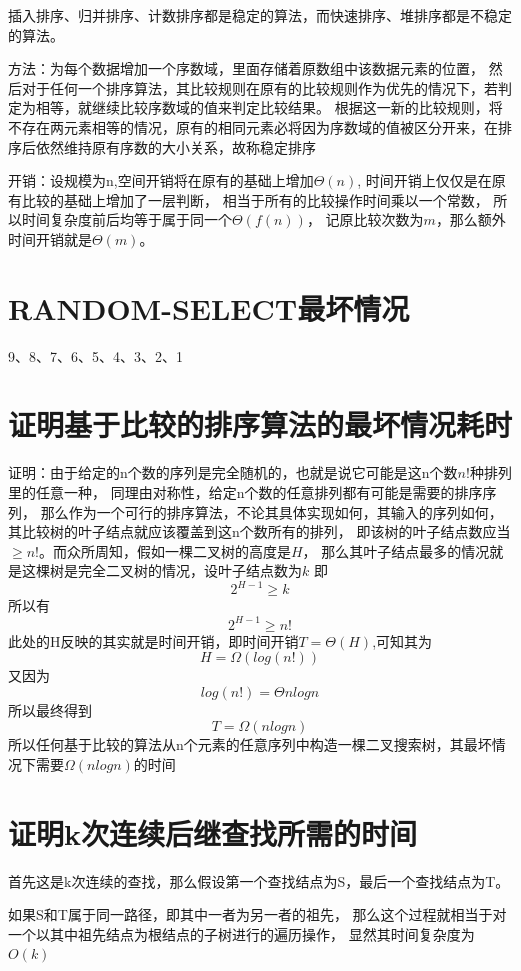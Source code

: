 \documentclass[cn,11pt,chinese]{elegantbook}
\begin{document}
插入排序、归并排序、计数排序都是稳定的算法，而快速排序、堆排序都是不稳定的算法。

方法：为每个数据增加一个序数域，里面存储着原数组中该数据元素的位置，
然后对于任何一个排序算法，其比较规则在原有的比较规则作为优先的情况下，若判定为相等，就继续比较序数域的值来判定比较结果。
根据这一新的比较规则，将不存在两元素相等的情况，原有的相同元素必将因为序数域的值被区分开来，在排序后依然维持原有序数的大小关系，故称稳定排序

开销：设规模为n,空间开销将在原有的基础上增加$\varTheta (n)$,
时间开销上仅仅是在原有比较的基础上增加了一层判断，
相当于所有的比较操作时间乘以一个常数，
所以时间复杂度前后均等于属于同一个$\varTheta (f(n))$，
记原比较次数为$m$，那么额外时间开销就是$\varTheta (m)$。

\section{RANDOM-SELECT最坏情况}

9、8、7、6、5、4、3、2、1

\section{证明基于比较的排序算法的最坏情况耗时}

证明：由于给定的n个数的序列是完全随机的，也就是说它可能是这n个数$n!$种排列里的任意一种，
同理由对称性，给定n个数的任意排列都有可能是需要的排序序列，
那么作为一个可行的排序算法，不论其具体实现如何，其输入的序列如何，
其比较树的叶子结点就应该覆盖到这n个数所有的排列，
即该树的叶子结点数应当$\ge n!$。而众所周知，假如一棵二叉树的高度是$H$，
那么其叶子结点最多的情况就是这棵树是完全二叉树的情况，设叶子结点数为$k$
即
$$2^{H-1}\ge k$$
所以有
$$2^{H-1}\ge n!$$
此处的H反映的其实就是时间开销，即时间开销$T = \varTheta (H)$,可知其为
$$H =\varOmega (log(n!))$$
又因为
$$log(n!) = \varTheta  nlogn$$
所以最终得到
$$T = \varOmega (nlogn)$$
所以任何基于比较的算法从n个元素的任意序列中构造一棵二叉搜索树，其最坏情况下需要$\varOmega (nlogn)$的时间

\section{证明k次连续后继查找所需的时间}
首先这是k次连续的查找，那么假设第一个查找结点为S，最后一个查找结点为T。

如果S和T属于同一路径，即其中一者为另一者的祖先，
那么这个过程就相当于对一个以其中祖先结点为根结点的子树进行的遍历操作，
显然其时间复杂度为$O (k)$
\end{document}
